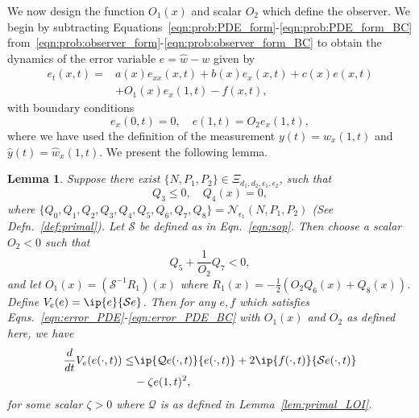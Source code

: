 \documentclass[US letter, 9 pt, conference]{ieeeconf}  \usepackage{setspace}
\newtheorem{lemma}{Lemma}
\newcommand{\wh}{\hat{w}}
\newcommand{\mcl}[1]{\mathcal{#1}}
\newcommand{\sop}{\mathcal{S}}
\newcommand{\sinv}{\mathcal{S}^{-1}}
\begin{document}
We now design the function $O_1(x)$ and scalar $O_2$ which define the observer.
We begin by subtracting Equations~\eqref{eqn:prob:PDE_form}-\eqref{eqn:prob:PDE_form_BC} from~\eqref{eqn:prob:observer_form}-\eqref{eqn:prob:observer_form_BC} to obtain the dynamics of the error variable $e=\wh-w$ given by
\begin{align}
e_t(x,t)=&a(x)e_{xx}(x,t)+b(x)e_x(x,t)+c(x)e(x,t)\nonumber \\
&\label{eqn:error_PDE}+O_1(x)e_x(1,t)-f(x,t),
\end{align} with boundary conditions
\begin{equation}\label{eqn:error_PDE_BC}
e_x(0,t)=0, \quad e(1,t)=O_2 e_x(1,t),
\end{equation} where we have used the definition of the measurement $y(t)=w_x(1,t)$ and $\hat{y}(t)=\wh_x(1,t)$. We present the following lemma.
\begin{lemma}\label{lem:observer}
Suppose there exist $\{N,P_1,P_2\} \in \Xi_{d_1,d_2,\epsilon_1,\epsilon_2}$, such that
\[
Q_3 \leq 0, \quad  Q_4(x)=0,
\]
where $\{Q_0,Q_1,Q_2,Q_3,Q_4,Q_5,Q_6,Q_7,Q_8\}=\mcl{N}_{\epsilon_1}\left(N,P_1,P_2\right)$ (See Defn.~\ref{def:primal}).
Let $\sop$ be defined as in Eqn.~\eqref{eqn:sop}. Then choose a scalar $O_2<0$ such that
\[
Q_5+\frac{1}{O_2}Q_7 <0,
\] and let $O_1(x)=\left(\sinv R_1\right)(x)$ where $R_1(x)=-\frac{1}{2} \left(O_2 Q_6(x)+Q_8(x) \right)$.
Define $V_e(e) = \ip{e}{\sop e}$. Then for any $e,f$ which satisfies Eqns.~\eqref{eqn:error_PDE}-\eqref{eqn:error_PDE_BC} with $O_1(x)$ and $O_2$ as defined here, we have
\begin{align*}
\frac{d}{dt}V_e(e(\cdot,t))\leq &\ip{\mcl{Q}e(\cdot,t)}{e(\cdot,t)}+2\ip{f(\cdot,t)}{\sop e(\cdot,t)} \nonumber \\
&  -\zeta e(1,t)^2,
\end{align*}
for some scalar $\zeta>0$ where $\mcl{Q}$ is as defined in Lemma~\ref{lem:primal_LOI}.
\end{lemma}
\end{document}
